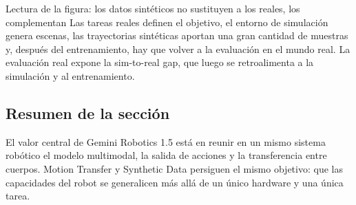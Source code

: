 \begin{knowledgebox}{Lectura de la figura: los datos sintéticos no sustituyen a los reales, los complementan}
Las tareas reales definen el objetivo, el entorno de simulación genera escenas, las trayectorias sintéticas aportan una gran cantidad de muestras y, después del entrenamiento, hay que volver a la evaluación en el mundo real. La evaluación real expone la sim-to-real gap, que luego se retroalimenta a la simulación y al entrenamiento.
\end{knowledgebox}

\subsection{Resumen de la sección}

El valor central de Gemini Robotics 1.5 está en reunir en un mismo sistema robótico el modelo multimodal, la salida de acciones y la transferencia entre cuerpos. Motion Transfer y Synthetic Data persiguen el mismo objetivo: que las capacidades del robot se generalicen más allá de un único hardware y una única tarea.
